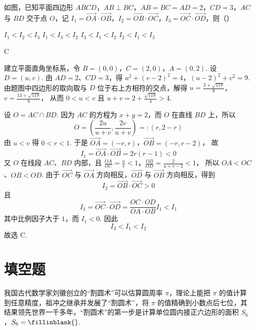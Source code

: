 \begin{problem}
如图，已知平面四边形 \(ABCD\)，\(AB\perp BC\)，\(AB=BC=AD=2\)，\(CD=3\)，\(AC\) 与 \(BD\) 交于点 \(O\)，记 \(I_1=\overrightarrow{OA}\cdot\overrightarrow{OB}\)，\(I_2=\overrightarrow{OB}\cdot\overrightarrow{OC}\)，\(I_3=\overrightarrow{OC}\cdot\overrightarrow{OD}\)，则（\quad）

\begin{center}
\end{center}

\choices
    {\(I_1<I_2<I_3\)}
    {\(I_1<I_3<I_2\)}
    {\(I_3<I_1<I_2\)}
    {\(I_2<I_1<I_3\)}
\end{problem}

\begin{answer}
C
\end{answer}

\begin{solution}
建立平面直角坐标系，令 \(B=(0,0)\)，\(C=(2,0)\)，\(A=(0,2)\). 设 \(D=(u,v)\). 由 \(AD=2\)、\(CD=3\)，得
\(u^2+(v-2)^2=4\)，\((u-2)^2+v^2=9\).
由题图中四边形的取向取与 \(D\) 位于右上方相符的交点，解得
\(u=\frac{3+\sqrt{119}}8\)，\(v=\frac{13+\sqrt{119}}8\)，
从而 \(0<u<v\) 且 \(u+v=2+\frac{\sqrt{119}}{4}>4\).

设 \(O=AC\cap BD\). 因为 \(AC\) 的方程为 \(x+y=2\)，而 \(O\) 在直线 \(BD\) 上，所以
\[
O=\left(\frac{2u}{u+v},\frac{2v}{u+v}\right)=:(r,2-r)
\]
由 \(u<v\) 得 \(0<r<1\). 于是
\(\overrightarrow{OA}=(-r,r)\)，\(\overrightarrow{OB}=(-r,r-2)\)，
故
\[
I_1=\overrightarrow{OA}\cdot\overrightarrow{OB}=2r(r-1)<0
\]
又 \(O\) 在线段 \(AC\)、\(BD\) 内部，且
\(\frac{OA}{OC}=\frac{u}{v}<1\)，\(\frac{OB}{OD}=\frac{2}{u+v-2}<1\)，
所以 \(OA<OC\)、\(OB<OD\). 由于 \(\overrightarrow{OC}\) 与 \(\overrightarrow{OA}\) 方向相反，\(\overrightarrow{OD}\) 与 \(\overrightarrow{OB}\) 方向相反，得到
\[
I_2=\overrightarrow{OB}\cdot\overrightarrow{OC}>0
\]
且
\[
I_3=\overrightarrow{OC}\cdot\overrightarrow{OD}
=\frac{OC\cdot OD}{OA\cdot OB}I_1<I_1
\]
其中比例因子大于 \(1\)，而 \(I_1<0\). 因此
\[
I_3<I_1<I_2
\]
故选 C.
\end{solution}

\section{填空题}

\begin{problem}
我国古代数学家刘徽创立的“割圆术”可以估算圆周率 \(\pi\)，理论上能把 \(\pi\) 的值计算到任意精度，祖冲之继承并发展了“割圆术”，将 \(\pi\) 的值精确到小数点后七位，其结果领先世界一千多年，“割圆术”的第一步是计算单位圆内接正六边形的面积 \(S_6\)，\(S_6=\fillinblank{}\).
\end{problem}

